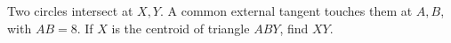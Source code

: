 Two circles intersect at $X,Y$. A common external tangent touches them at $A,B$, with $AB=8$. If $X$ is the centroid of triangle $ABY$, find $XY$.
